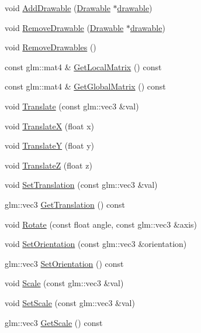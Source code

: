 \begin{DoxyCompactItemize}
void \mbox{\hyperlink{classec_1_1_node_aee80ae03faf344743ab38944ce3ced5f}{Add\+Drawable}} (\mbox{\hyperlink{classec_1_1_drawable}{Drawable}} $\ast$\mbox{\hyperlink{namespaceec_ae4420ccd0f79418a5ce075e43909289fac571a3227368b17e0ecc38a2a417e201}{drawable}})
\item 
void \mbox{\hyperlink{classec_1_1_node_acd641d3927ae368628ac90d5d79597d9}{Remove\+Drawable}} (\mbox{\hyperlink{classec_1_1_drawable}{Drawable}} $\ast$\mbox{\hyperlink{namespaceec_ae4420ccd0f79418a5ce075e43909289fac571a3227368b17e0ecc38a2a417e201}{drawable}})
\item 
void \mbox{\hyperlink{classec_1_1_node_ad874f229d3602ac6f0d0f0ce502a1fbc}{Remove\+Drawables}} ()
\item 
const glm\+::mat4 \& \mbox{\hyperlink{classec_1_1_node_a166d54a9128b6f4d552cf83d8f10856c}{Get\+Local\+Matrix}} () const
\item 
const glm\+::mat4 \& \mbox{\hyperlink{classec_1_1_node_a65650fa6bb55597cc2436949e95321ca}{Get\+Global\+Matrix}} () const
\item 
void \mbox{\hyperlink{classec_1_1_node_a6fa8ebdc20482b2bceb518b1e14b44de}{Translate}} (const glm\+::vec3 \&val)
\item 
void \mbox{\hyperlink{classec_1_1_node_a04817a276d8ba5432d6a42f4403520ef}{TranslateX}} (float x)
\item 
void \mbox{\hyperlink{classec_1_1_node_a823a4ed88acaf530b29901bb8c50e920}{TranslateY}} (float y)
\item 
void \mbox{\hyperlink{classec_1_1_node_a4f3622e18ba67afc383d69f31c073b8e}{TranslateZ}} (float z)
\item 
void \mbox{\hyperlink{classec_1_1_node_a4948bc000406051044e4bc9fa4c3f799}{Set\+Translation}} (const glm\+::vec3 \&val)
\item 
glm\+::vec3 \mbox{\hyperlink{classec_1_1_node_ae29fe5673f7007449d2efa0e599ac0db}{Get\+Translation}} () const
\item 
void \mbox{\hyperlink{classec_1_1_node_a131b4280ff9eba0a9cdf1280e2974fcc}{Rotate}} (const float angle, const glm\+::vec3 \&axis)
\item 
void \mbox{\hyperlink{classec_1_1_node_a4b00f16b05542f0abfcc7eafbad50319}{Set\+Orientation}} (const glm\+::vec3 \&orientation)
\item 
glm\+::vec3 \mbox{\hyperlink{classec_1_1_node_a841071e180e27ad6ced9878aa284c933}{Set\+Orientation}} () const
\item 
void \mbox{\hyperlink{classec_1_1_node_acd826d1dcd58f5588b8ea75068ddff67}{Scale}} (const glm\+::vec3 \&val)
\item 
void \mbox{\hyperlink{classec_1_1_node_a13c6ef1c96edf0027f66be0c7457bd83}{Set\+Scale}} (const glm\+::vec3 \&val)
\item 
glm\+::vec3 \mbox{\hyperlink{classec_1_1_node_ac77ed7b5dd0920f72484a36b665f8883}{Get\+Scale}} () const
\end{DoxyCompactItemize}
